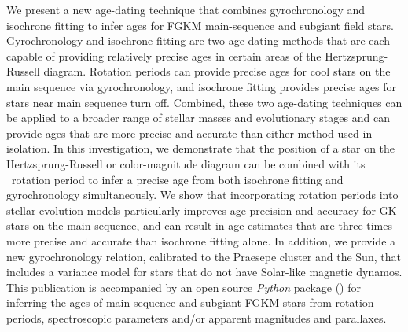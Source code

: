 We present a new age-dating technique that combines gyrochronology and
isochrone fitting to infer ages for FGKM main-sequence and subgiant field
stars.
Gyrochronology and isochrone fitting are two age-dating methods that are each
capable of providing relatively precise ages in certain areas of the
Hertzsprung-Russell diagram.
Rotation periods can provide precise ages for cool stars on the main sequence
via gyrochronology, and isochrone fitting provides precise ages for stars near
main sequence turn off.
Combined, these two age-dating techniques can be applied to a broader range of
stellar masses and evolutionary stages and can provide ages that are more
precise and accurate than either method used in isolation.
In this investigation, we demonstrate that the position of a star on the
Hertzsprung-Russell or color-magnitude diagram can be combined with its
\kepler\ rotation period to infer a precise age from both isochrone fitting
and gyrochronology simultaneously.
We show that incorporating rotation periods into stellar evolution models
particularly improves age precision and accuracy for GK stars on the main
sequence, and can result in age estimates that are three times more precise
and accurate than isochrone fitting alone.
In addition, we provide a new gyrochronology relation, calibrated to the
Praesepe cluster and the Sun, that includes a variance model for stars that
do not have Solar-like magnetic dynamos.
This publication is accompanied by an open source {\it Python} package (\sd)
for inferring the ages of main sequence and subgiant FGKM stars from rotation
periods, spectroscopic parameters and/or apparent magnitudes and parallaxes.
